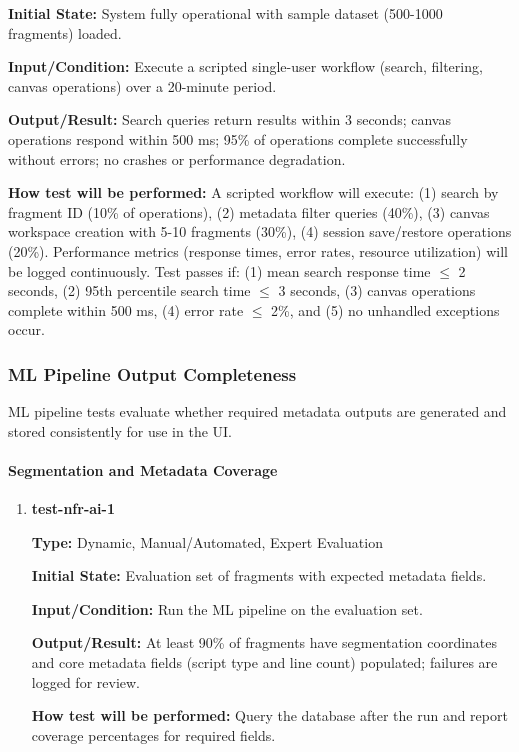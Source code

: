 \documentclass[12pt, titlepage]{article}
\begin{document}
\begin{enumerate}
\textbf{Initial State:} System fully operational with sample dataset (500-1000 fragments) loaded.

\textbf{Input/Condition:} Execute a scripted single-user workflow (search, filtering, canvas operations) over a 20-minute period.

\textbf{Output/Result:} Search queries return results within 3 seconds; canvas operations respond within 500 ms; 95\% of operations complete successfully without errors; no crashes or performance degradation.

\textbf{How test will be performed:} A scripted workflow will execute: (1) search by fragment ID (10\% of operations), (2) metadata filter queries (40\%), (3) canvas workspace creation with 5-10 fragments (30\%), (4) session save/restore operations (20\%). Performance metrics (response times, error rates, resource utilization) will be logged continuously. Test passes if: (1) mean search response time $\leq$ 2 seconds, (2) 95th percentile search time $\leq$ 3 seconds, (3) canvas operations complete within 500 ms, (4) error rate $\leq$ 2\%, and (5) no unhandled exceptions occur.

\end{enumerate}

\subsubsection{ML Pipeline Output Completeness}

ML pipeline tests evaluate whether required metadata outputs are generated and stored consistently for use in the UI.

\paragraph{Segmentation and Metadata Coverage}

\begin{enumerate}

\item \textbf{test-nfr-ai-1}

\textbf{Type:} Dynamic, Manual/Automated, Expert Evaluation

\textbf{Initial State:} Evaluation set of fragments with expected metadata fields.

\textbf{Input/Condition:} Run the ML pipeline on the evaluation set.

\textbf{Output/Result:} At least 90\% of fragments have segmentation coordinates and core metadata fields (script type and line count) populated; failures are logged for review.

\textbf{How test will be performed:} Query the database after the run and report coverage percentages for required fields.

\end{enumerate}
\end{document}
